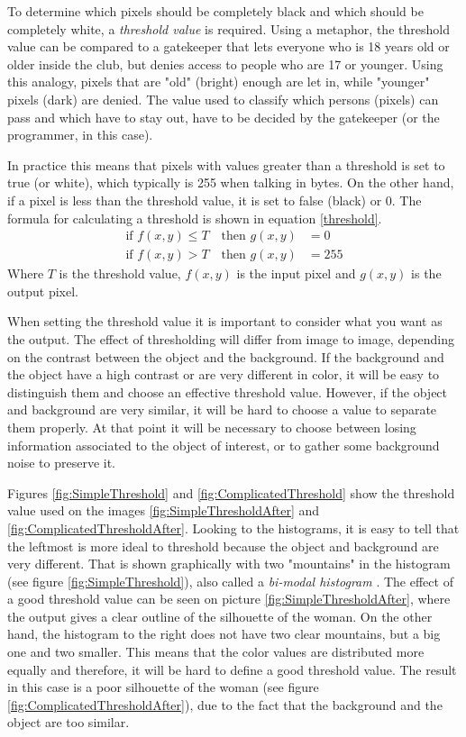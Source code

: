 To determine which pixels should be completely black and which should be completely white, a \textit{threshold value} is required. Using a metaphor, the threshold value can be compared to a gatekeeper that lets everyone who is 18 years old or older inside the club, but denies access to people who are 17 or younger. Using this analogy, pixels that are "old" (bright) enough are let in, while "younger" pixels (dark) are denied. The value used to classify which persons (pixels) can pass and which have to stay out, have to be decided by the gatekeeper (or the programmer, in this case).

In practice this means that pixels with values greater than a threshold is set to true (or white), which typically is 255 when talking in bytes. On the other hand, if a pixel is less than the threshold value, it is set to false (black) or 0. The formula for calculating a threshold is shown in equation \ref{threshold}.
\begin{equation}
  \begin{aligned}
  	\text{if } f(x,y)\leq T \quad \text{then } g(x,y)&= 0 \\
  	\text{if } f(x,y)>T \quad \text{then } g(x,y)&= 255
	\label{threshold}  
  \end{aligned} 
\end{equation}
Where $T$ is the threshold value, $f(x,y)$ is the input pixel and $g(x,y)$ is the output pixel. 

When setting the threshold value it is important to consider what you want as the output. The effect of thresholding will differ from image to image, depending on the contrast between the object and the background. If the background and the object have a high contrast or are very different in color, it will be easy to distinguish them and choose an effective threshold value. However, if the object and background are very similar, it will be hard to choose a value to separate them properly. At that point it will be necessary to choose between losing information associated to the object of interest, or to gather some background noise to preserve it.

Figures \ref{fig:SimpleThreshold} and \ref{fig:ComplicatedThreshold} show the threshold value used on the images \ref{fig:SimpleThresholdAfter} and \ref{fig:ComplicatedThresholdAfter}. Looking to the histograms, it is easy to tell that the leftmost is more ideal to threshold because the object and background are very different. That is shown graphically with two "mountains" in the histogram (see figure \ref{fig:SimpleThreshold}), also called a \textit{bi-modal histogram} \citep{ip_book}. The effect of a good threshold value can be seen on picture \ref{fig:SimpleThresholdAfter}, where the output gives a clear outline of the silhouette of the woman. On the other hand, the histogram to the right does not have two clear mountains, but a big one and two smaller. This means that the color values are distributed more equally and therefore, it will be hard to define a good threshold value. The result in this case is a poor silhouette of the woman (see figure \ref{fig:ComplicatedThresholdAfter}), due to the fact that the background and the object are too similar.

